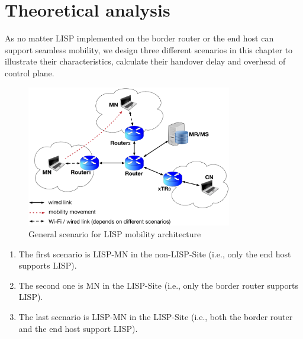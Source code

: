 {\section{Theoretical analysis}
\label{sec:ns3_analysis}
As no matter LISP implemented on the border router or the end host can support seamless mobility, we design three different scenarios in this chapter to illustrate their characteristics, calculate their handover delay and overhead of control plane. 
\begin{figure}[!th]
	\centering
	\includegraphics[width=0.8\textwidth]{Pics/LISP_mobility_archi}
	\caption{General scenario for LISP mobility architecture}
	\label{sim_archi}
\end{figure}
\begin{enumerate}[noitemsep,topsep=0pt]
	\item The first scenario is LISP-MN in the non-LISP-Site (i.e., only the end host supports LISP). 
	\item The second one is MN in the LISP-Site (i.e., only the border router supports LISP). 
	\item The last scenario is LISP-MN in the LISP-Site (i.e., both the border router and the end host support LISP). 
\end{enumerate}	
}
